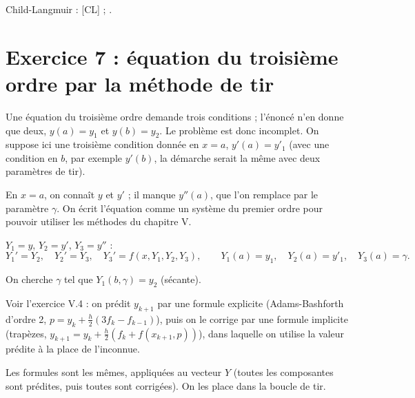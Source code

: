 \Refs Child-Langmuir : [CL] ; .

\section{Exercice 7 : équation du troisième ordre par la méthode de tir}

\Attention Une équation du troisième ordre demande trois conditions ; l'énoncé
n'en donne que deux, $y(a) = y_1$ et $y(b) = y_2$. Le problème est donc
incomplet. On suppose ici une troisième condition donnée en $x = a$,
$y'(a) = y'_1$ (avec une condition en $b$, par exemple $y'(b)$, la démarche
serait la même avec deux paramètres de tir).

\Pourquoi En $x = a$, on connaît $y$ et $y'$ ; il manque $y''(a)$, que l'on
remplace par le paramètre $\gamma$. On écrit l'équation comme un système du
premier ordre pour pouvoir utiliser les méthodes du chapitre V.

 $Y_1 = y$, $Y_2 = y'$, $Y_3 = y''$ :
\[
  Y_1' = Y_2, \quad Y_2' = Y_3, \quad Y_3' = f(x, Y_1, Y_2, Y_3), \qquad
  Y_1(a) = y_1, \quad Y_2(a) = y'_1, \quad Y_3(a) = \gamma .
\]

 On cherche $\gamma$ tel que $Y_1(b, \gamma) = y_2$ (sécante).

Voir l'exercice V.4 : on prédit $y_{k+1}$ par une formule explicite
(Adams-Bashforth d'ordre 2, $p = y_k + \frac h2(3f_k - f_{k-1})$), puis on le
corrige par une formule implicite (trapèzes,
$y_{k+1} = y_k + \frac h2(f_k + f(x_{k+1}, p))$), dans laquelle on utilise la
valeur prédite à la place de l'inconnue.

\Pourquoi Les formules sont les mêmes, appliquées au vecteur $Y$ (toutes les
composantes sont prédites, puis toutes sont corrigées). On les place dans la
boucle de tir.

